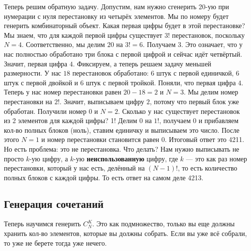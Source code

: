 \documentclass[12pt]{article}
\begin{document}
Теперь решим обратную задачу. Допустим, нам нужно сгенерить 20-ую при нумерации с нуля перестановку из четырёх элементов. Мы по номеру будет генерить комбинаторный объект. Какая первая цифры будет в этой перестановке? Мы знаем, что для каждой первой цифры существует $3!$ перестановок, поскольку $N = 4$. Соответственно, мы делим $20$ на $3!=6$. Получаем $3$. Это означает, что у нас полностью обработано три блока с первой цифрой и сейчас идёт четвёртый. Значит, первая цифра $4$. Фиксируем, а теперь решаем задачу меньшей размерности. У нас $18$ перестановок обработано: $6$ штук с первой единичкой, $6$ штук с первой двойкой и $6$ штук с первой тройкой. Поняли, что первая цифра $4$. Теперь у нас номер перестановки равен $20-18=2$ и $N=3$. Мы делим номер перестановки на $2!$. Значит, выписываем цифру $2$, потому что первый блок уже обработан. Получили номер $0$ и $N=2$. Сколько у нас существует перестановок из 2 элементов для каждой цифры? 1! Делим $0$ на $1!$, получаем $0$ и прибавляем кол-во полных блоков (ноль), ставим единичку и выписываем это число. После этого $N=1$ и номер перестановки становится равен $0$. Итоговый ответ это 4211. Но есть проблема: это не перестановка. Что делать? Нам нужно выписывать не просто $k$-ую цифру, а $k$-ую \textbf{неиспользованную} цифру, где $k$ --- это как раз номер перестановки, который у нас есть, делённый на $(N-1)!$, то есть количество полных блоков с каждой цифры. То есть ответ на самом деле 4213. 

\subsection*{Генерация сочетаний}
Теперь научимся генерить $C_N^K$. Это как подмножество, только вы еще должны хранить кол-во элементов, которые вы должны собрать. Если вы уже всё собрали, то уже не берете тогда уже нечего. 
\end{document}
